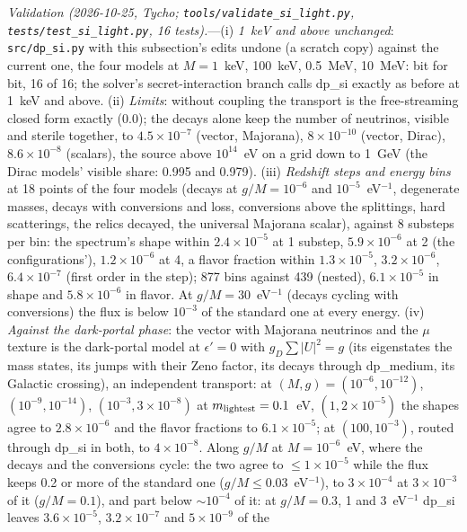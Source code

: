 \documentclass[11pt,a4paper]{article}
\newcommand{\file}[1]{\nolinkurl{#1}}
\newcommand{\gd}{g_D}
\newcommand{\epsp}{\epsilon'}
\begin{document}
\textit{Validation (2026-10-25, Tycho; \file{tools/validate\_si\_light.py}, \file{tests/test\_si\_light.py}, 16
tests).}---(i) \emph{1~keV and above unchanged}: \file{src/dp\_si.py} with this subsection's edits undone (a scratch
copy) against the current one, the four models at $M = 1$~keV, 100~keV, 0.5~MeV, 10~MeV: bit for bit, 16 of 16; the
solver's secret-interaction branch calls dp\_si exactly as before at 1~keV and above. (ii) \emph{Limits}: without
coupling the transport is the free-streaming closed form exactly (0.0); the decays alone keep the number of neutrinos,
visible and sterile together, to $4.5\times10^{-7}$ (vector, Majorana), $8\times10^{-10}$ (vector, Dirac),
$8.6\times10^{-8}$ (scalars), the source above $10^{14}$~eV on a grid down to 1~GeV (the Dirac models' visible share:
0.995 and 0.979). (iii) \emph{Redshift steps and energy bins} at 18 points of the four models (decays at $g/M = 10^{-6}$
and $10^{-5}$~eV$^{-1}$, degenerate masses, decays with conversions and loss, conversions above the splittings, hard
scatterings, the relics decayed, the universal Majorana scalar), against 8 substeps per bin: the spectrum's shape within
$2.4\times10^{-5}$ at 1 substep, $5.9\times10^{-6}$ at 2 (the configurations'), $1.2\times10^{-6}$ at 4, a flavor fraction
within $1.3\times10^{-5}$, $3.2\times10^{-6}$, $6.4\times10^{-7}$ (first order in the step); 877 bins against 439 (nested),
$6.1\times10^{-5}$ in shape and $5.8\times10^{-6}$ in flavor. At $g/M = 30$~eV$^{-1}$ (decays cycling with conversions)
the flux is below $10^{-3}$ of the standard one at every energy. (iv) \emph{Against the dark-portal phase}: the vector
with Majorana neutrinos and the $\mu$ texture is the dark-portal model at $\epsp = 0$ with $\gd\sum|U|^2 = g$ (its
eigenstates the mass states, its jumps with their Zeno factor, its decays through dp\_medium, its Galactic crossing),
an independent transport: at $(M, g) = (10^{-6}, 10^{-12})$, $(10^{-9}, 10^{-14})$, $(10^{-3}, 3\times10^{-8})$ at
$m_{\rm lightest} = 0.1$~eV, $(1, 2\times10^{-5})$ the shapes agree to $2.8\times10^{-6}$ and the flavor fractions to
$6.1\times10^{-5}$; at $(100, 10^{-3})$, routed through dp\_si in both, to $4\times10^{-8}$. Along $g/M$ at $M = 10^{-6}$~eV, where
the decays and the conversions cycle: the two agree to $\le1\times10^{-5}$ while the flux keeps 0.2 or more of the standard
one ($g/M \le 0.03$~eV$^{-1}$), to $3\times10^{-4}$ at $3\times10^{-3}$ of it ($g/M = 0.1$), and part below $\sim10^{-4}$ of
it: at $g/M = 0.3$, 1 and 3~eV$^{-1}$ dp\_si leaves $3.6\times10^{-5}$, $3.2\times10^{-7}$ and $5\times10^{-9}$ of the
\end{document}
